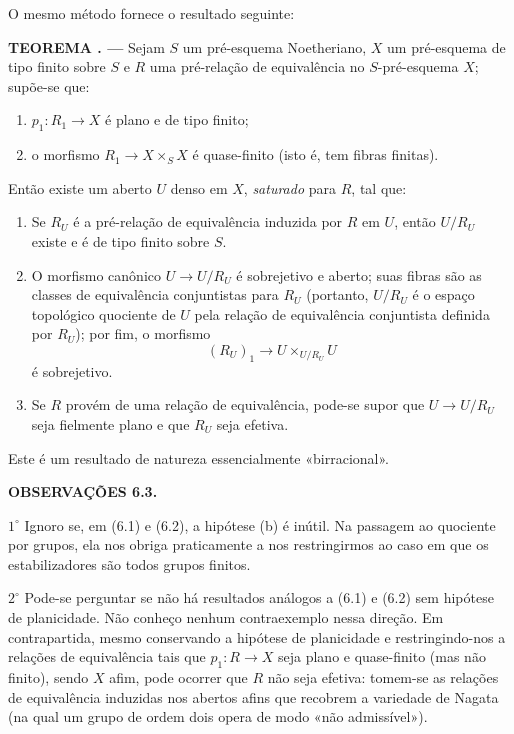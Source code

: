 \documentclass[11pt,twoside,openany]{book}
\numberwithin{equation}{section}
\newcommand{\src}[1]{%
  \phantomsection\hypertarget{src:#1}{}%
  \marginpar{\raggedleft\footnotesize\sffamily #1}%
}
\theoremstyle{plain}
\theoremstyle{definition}
\theoremstyle{remark}
\newcommand{\result}[2]{%
  \par\medskip\noindent\textbf{#1%
  \if\relax\detokenize{#2}\relax\else\space#2\fi. ---}\enspace
}
\newcommand{\FgaUnitKey}{frontmatter}
\renewcommand{\src}[1]{%
  \phantomsection\hypertarget{src:\FgaUnitKey:#1}{}%
  \marginpar{\raggedleft\footnotesize\sffamily #1}%
}
\begin{document}
O mesmo método fornece o resultado seguinte:

\result{TEOREMA}{6.2} Sejam $S$ um pré-esquema Noetheriano, $X$ um
pré-esquema de tipo finito sobre $S$ e $R$ uma pré-relação de equivalência no
$S$-pré-esquema $X$; supõe-se que:
\begin{enumerate}
\item[(a)] $p_1:R_1\to X$ é plano e de tipo finito;
\item[(b)] o morfismo $R_1\to X\times_S X$ é quase-finito (isto é, tem fibras
finitas).
\end{enumerate}
Então existe um aberto $U$ denso em $X$, \emph{saturado} para $R$, tal que:
\begin{enumerate}
\item[(i)] Se $R_U$ é a pré-relação de equivalência induzida por $R$ em $U$,
então $U/R_U$ existe e é de tipo finito sobre $S$.

\item[(ii)] O morfismo canônico $U\to U/R_U$ é sobrejetivo e aberto; suas
fibras são as classes de equivalência conjuntistas para $R_U$ (portanto,
$U/R_U$ é o espaço topológico quociente de $U$ pela relação de equivalência
conjuntista definida por $R_U$); por fim, o morfismo
\[
  (R_U)_1\longrightarrow U\times_{U/R_U}U
\]
é sobrejetivo.
\src{114}

\item[(iii)] Se $R$ provém de uma relação de equivalência, pode-se supor que
$U\to U/R_U$ seja fielmente plano e que $R_U$ seja efetiva.
\end{enumerate}

Este é um resultado de natureza essencialmente «birracional».

\medskip
\noindent\textbf{OBSERVAÇÕES 6.3.}

\smallskip
\noindent $1^\circ$ Ignoro se, em (6.1) e (6.2), a hipótese (b) é inútil. Na
passagem ao quociente por grupos, ela nos obriga praticamente a nos
restringirmos ao caso em que os estabilizadores são todos grupos finitos.

\smallskip
\noindent $2^\circ$ Pode-se perguntar se não há resultados análogos a (6.1) e
(6.2) sem hipótese de planicidade. Não conheço nenhum contraexemplo nessa
direção. Em contrapartida, mesmo conservando a hipótese de planicidade e
restringindo-nos a relações de equivalência tais que $p_1:R\to X$ seja plano e
quase-finito (mas não finito), sendo $X$ afim, pode ocorrer que $R$ não seja
efetiva: tomem-se as relações de equivalência induzidas nos abertos afins que
recobrem a variedade de Nagata (na qual um grupo de ordem dois opera de modo
«não admissível»).
\end{document}
